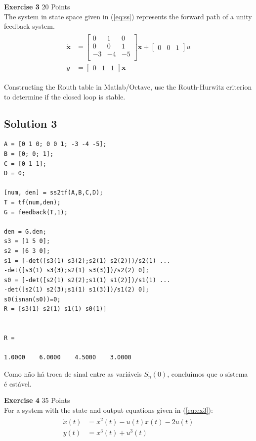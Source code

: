 \documentclass[a4paper,11pt]{article}
\begin{document}
{\Large \noindent \bf Exercise 3} \hfill					20 Points\\

\noindent The system in state space given in (\ref{eq:ss}) represents the forward path of a unity feedback system. 
\begin{align}
\begin{split}
\mathbf{\dot{x}} & =\begin{bmatrix}
0 & 1 & 0\\
0 & 0 & 1\\
-3 & -4 & -5\\
\end{bmatrix}
\mathbf{x}+\begin{bmatrix}
0 & 0 & 1
\end{bmatrix}
u \\
y & = \begin{bmatrix}
0 & 1 & 1
\end{bmatrix}
\mathbf{x}
\end{split}
\label{eq:ss}
\end{align}

\noindent Constructing the Routh table in Matlab/Octave, use the Routh-Hurwitz criterion to determine if the closed loop is stable.

\vskip0.5cm

\subsection*{Solution 3}
\begin{lstlisting}
A = [0 1 0; 0 0 1; -3 -4 -5];
B = [0; 0; 1];
C = [0 1 1];
D = 0;

[num, den] = ss2tf(A,B,C,D);
T = tf(num,den);
G = feedback(T,1);

den = G.den;
s3 = [1 5 0];
s2 = [6 3 0];
s1 = [-det([s3(1) s3(2);s2(1) s2(2)])/s2(1) ...
-det([s3(1) s3(3);s2(1) s3(3)])/s2(2) 0];
s0 = [-det([s2(1) s2(2);s1(1) s1(2)])/s1(1) ...
-det([s2(1) s2(3);s1(1) s1(3)])/s1(2) 0];
s0(isnan(s0))=0;
R = [s3(1) s2(1) s1(1) s0(1)]


R =

1.0000    6.0000    4.5000    3.0000
\end{lstlisting}
Como não há troca de sinal entre as variáveis $S_n(0)$, concluímos que o sistema é estável.
\vskip0.4cm

{\Large \noindent \bf Exercise 4} \hfill					35 Points\\

\noindent  For a system with the state and output equations given in (\ref{eq:ex3}):
\begin{align}
\begin{split}
\dot{x}(t)& =x^2(t)-u(t)x(t)-2u(t)\\
y(t)& =x^3(t)+u^3(t)
\end{split}
\label{eq:ex3}
\end{align}  
\end{document}
